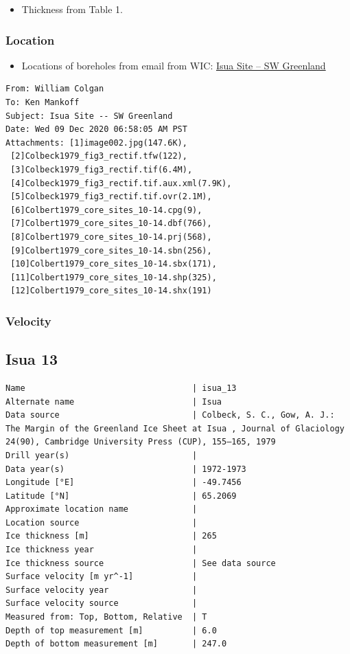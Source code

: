 \documentclass[article,a4paper,times,11pt,twoside]{article}
\begin{document}
\begin{itemize}
\item Thickness from \textcite{colbeck_1979} Table 1.
\end{itemize}

\subsubsection{Location}
\label{sec:orgbd20cde}

\begin{itemize}
\item Locations of boreholes from email from WIC: \href{msgid:AM0PR04MB6129F131ECD9123E72752945A2CC0@AM0PR04MB6129.eurprd04.prod.outlook.com}{Isua Site -- SW Greenland}
\end{itemize}

\begin{verbatim}
From: William Colgan
To: Ken Mankoff
Subject: Isua Site -- SW Greenland
Date: Wed 09 Dec 2020 06:58:05 AM PST
Attachments: [1]image002.jpg(147.6K),
 [2]Colbeck1979_fig3_rectif.tfw(122),
 [3]Colbeck1979_fig3_rectif.tif(6.4M),
 [4]Colbeck1979_fig3_rectif.tif.aux.xml(7.9K),
 [5]Colbeck1979_fig3_rectif.tif.ovr(2.1M),
 [6]Colbert1979_core_sites_10-14.cpg(9),
 [7]Colbert1979_core_sites_10-14.dbf(766),
 [8]Colbert1979_core_sites_10-14.prj(568),
 [9]Colbert1979_core_sites_10-14.sbn(256),
 [10]Colbert1979_core_sites_10-14.sbx(171),
 [11]Colbert1979_core_sites_10-14.shp(325),
 [12]Colbert1979_core_sites_10-14.shx(191)
\end{verbatim}

\subsubsection{Velocity}
\label{sec:org5de3b1e}
\clearpage
\subsection{Isua 13}
\label{sec:orgef00234}
\begin{verbatim}
Name                                  | isua_13
Alternate name                        | Isua
Data source                           | Colbeck, S. C., Gow, A. J.: The Margin of the Greenland Ice Sheet at Isua , Journal of Glaciology 24(90), Cambridge University Press (CUP), 155–165, 1979 
Drill year(s)                         | 
Data year(s)                          | 1972-1973
Longitude [°E]                        | -49.7456
Latitude [°N]                         | 65.2069
Approximate location name             | 
Location source                       | 
Ice thickness [m]                     | 265
Ice thickness year                    | 
Ice thickness source                  | See data source
Surface velocity [m yr^-1]            | 
Surface velocity year                 | 
Surface velocity source               | 
Measured from: Top, Bottom, Relative  | T
Depth of top measurement [m]          | 6.0
Depth of bottom measurement [m]       | 247.0
\end{verbatim}
\end{document}
